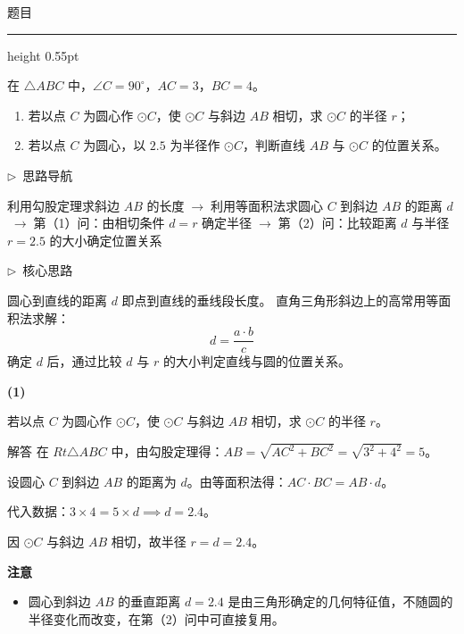 \documentclass{exam-zh}
\newcommand{\edukai}{\kaishu}
\newenvironment{eduSubQuestionItem}[1]{%
  \needspace{4\baselineskip}%
  \vspace{2mm}
  \par\noindent
  \hangindent=8mm\hangafter=1
  {\color{edu-blue}\bfseries #1}\enspace
  \begingroup
  \color{edu-ink}
}{%
  \endgroup
  \par
  \vspace{3mm}
}
\newenvironment{eduAuxItem}[1]{%
  \needspace{4\baselineskip}%
  \vspace{2mm}
  \par\noindent
  \hangindent=8mm\hangafter=1
  {\color{edu-blue}\edukai $\triangleright$~#1}\enspace
  \begingroup
  \color{edu-ink}
  \edukai
}{%
  \endgroup
  \par
  \vspace{4mm}
}
\newenvironment{eduProblemBlock}[1][题目]{%
  \needspace{8\baselineskip}
  {\small\color{edu-muted}#1}\par
  \vspace{1.5mm}
  {\color{edu-blue}\hrule height 0.55pt}
  \vspace{4.5mm}
  \begingroup
  \color{edu-ink}
  \large
  \setlength{\parskip}{2.2mm}
  \linespread{1.20}\selectfont
}{%
  \par
  \endgroup
  \vspace{6mm}
}
\newenvironment{eduBulletList}{%
  \begin{itemize}[
    label=\textbullet,
    leftmargin=5mm,
    itemsep=1.2mm,
    topsep=0pt,
    parsep=0pt
  ]
}{%
  \end{itemize}
}
\begin{document}
\begin{eduProblemBlock}[题目]
在 $\triangle ABC$ 中，$\angle C = 90^\circ$，$AC = 3$，$BC = 4$。
\begin{enumerate}[label=(\arabic*)]
  \item 若以点 $C$ 为圆心作 $\odot C$，使 $\odot C$ 与斜边 $AB$ 相切，求 $\odot C$ 的半径 $r$；
  \item 若以点 $C$ 为圆心，以 $2.5$ 为半径作 $\odot C$，判断直线 $AB$ 与 $\odot C$ 的位置关系。
\end{enumerate}

\end{eduProblemBlock}









\begin{eduAuxItem}{思路导航}
利用勾股定理求斜边 $AB$ 的长度$\;\to\;$利用等面积法求圆心 $C$ 到斜边 $AB$ 的距离 $d$$\;\to\;$第（1）问：由相切条件 $d = r$ 确定半径$\;\to\;$第（2）问：比较距离 $d$ 与半径 $r = 2.5$ 的大小确定位置关系\end{eduAuxItem}




\begin{eduAuxItem}{核心思路}
圆心到直线的距离 $d$ 即点到直线的垂线段长度。
直角三角形斜边上的高常用等面积法求解：
$$d = \frac{a \cdot b}{c}$$
确定 $d$ 后，通过比较 $d$ 与 $r$ 的大小判定直线与圆的位置关系。
\end{eduAuxItem}




\begin{eduSubQuestionItem}{(1)}
若以点 $C$ 为圆心作 $\odot C$，使 $\odot C$ 与斜边 $AB$ 相切，求 $\odot C$ 的半径 $r$。\end{eduSubQuestionItem}

\begin{eduSolutionBox}{解答}
  \begingroup
  \setlength{\parskip}{2.5mm}
在 $Rt\triangle ABC$ 中，由勾股定理得：$AB = \sqrt{AC^2 + BC^2} = \sqrt{3^2 + 4^2} = 5$。\par
设圆心 $C$ 到斜边 $AB$ 的距离为 $d$。由等面积法得：$AC \cdot BC = AB \cdot d$。\par
代入数据：$3 \times 4 = 5 \times d \implies d = 2.4$。\par
因 $\odot C$ 与斜边 $AB$ 相切，故半径 $r = d = 2.4$。\par
  \endgroup
  \vspace{2.5mm}
  {\color{edu-blue}\bfseries\small 注意}\par\vspace{1.5mm}
  \begin{eduBulletList}
    \item 圆心到斜边 $AB$ 的垂直距离 $d = 2.4$ 是由三角形确定的几何特征值，不随圆的半径变化而改变，在第（2）问中可直接复用。  \end{eduBulletList}
\end{eduSolutionBox}
\end{document}
